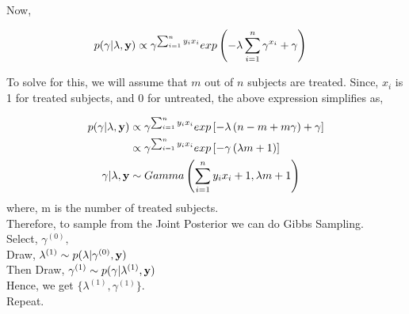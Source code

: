 \documentclass{article}
\begin{document}
\noindent Now,

\begin{align*}
p(\gamma|\lambda,\bold{y}) &\propto \gamma^{\sum_{i=1}^{n}y_ix_i} exp\left(-\lambda\sum_{i=1}^{n}\gamma^{x_i} +\gamma\right)
\end{align*}

\noindent To solve for this, we will assume that $m$ out of $n$ subjects are treated. Since, $x_i$ is 1 for treated subjects, and 0 for untreated, the above expression simplifies as,

\begin{align*}
p(\gamma|\lambda,\bold{y}) &\propto \gamma^{\sum_{i=1}^{n}y_ix_i} exp\left[-\lambda\left(n-m+m\gamma\right)+\gamma\right]\\
&\propto \gamma^{\sum_{i=1}^{n}y_ix_i} exp\left[ -\gamma\left(\lambda m+1\right)\right]\\
\gamma|\lambda,\bold{y} &\sim Gamma\left(\sum_{i=1}^{n}y_ix_i+1,\lambda m+1\right)\\
\end{align*}
where, m is the number of treated subjects.\\

\noindent Therefore, to sample from the Joint Posterior we can do Gibbs Sampling.\\
Select, $\gamma^{(0)},$\\
Draw, $\lambda^{(1)} \sim p(\lambda|\gamma^{(0)},\bold{y})$\\
Then Draw, $\gamma^{(1)} \sim p(\gamma|\lambda^{(1)},\bold{y})$\\
Hence, we get $\{\lambda^{(1)},\gamma^{(1)}\}$.\\
Repeat.
\end{document}
